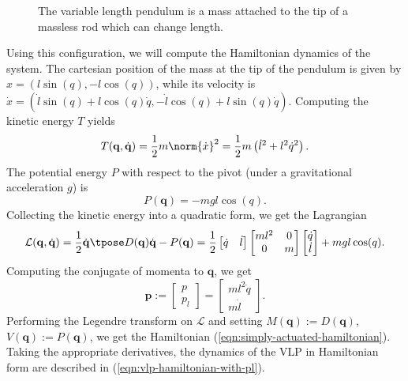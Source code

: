 \begin{figure}
   \centering
   
   \caption{The variable length pendulum is a mass attached to the
      tip of a massless rod which can change length.}\label{fig:vlp-model}
\end{figure}

Using this configuration, we will compute the Hamiltonian dynamics of the system.
The cartesian position of the mass at the tip of the pendulum
is given by \(x = (l\sin(q),-l\cos(q))\), while its velocity is
\(\dot{x} = (\dot{l}\sin(q) + l\cos(q)\dot{q}, -\dot{l}\cos(q) + l\sin(q)\dot{q})\).
Computing the kinetic energy \(T\) yields
\[
   T(\mathbf{q},\dot{\mathbf{q}}) = 
   \frac{1}{2}m\norm{\dot{x}}^2 = \frac{1}{2}m\left(\dot{l}^2 + l^2\dot{q}^2\right)
   .
\]
The potential energy \(P\) with respect to the pivot (under a gravitational
acceleration \(g\)) is
\[
   P(\mathbf{q}) = -mgl\cos(q)
   .
\]
Collecting the kinetic energy into a quadratic form, we get the Lagrangian
\[
   \mathcal{L}(\mathbf{q},\dot{\mathbf{q}}) 
   = \frac{1}{2} \dot{\mathbf{q}}\tpose D(\mathbf{q})\dot{\mathbf{q}} - P(\mathbf{q})
   = \frac{1}{2}
   \begin{bmatrix} \dot{q} & \dot{l} \end{bmatrix}
   \begin{bmatrix}
      ml^2 & 0 \\
      0 & m \\
   \end{bmatrix}
   \begin{bmatrix} 
      \dot{q} \\ \dot{l}
   \end{bmatrix}
   + mgl\cos(q)
   .
\]
Computing the conjugate of momenta to \(\mathbf{q}\), we get 
\[
   \mathbf{p} := \begin{bmatrix} p \\ p_l \end{bmatrix} 
   = \begin{bmatrix} ml^2\dot{q} \\ m\dot{l} \end{bmatrix} 
   .
\]
Performing the Legendre transform on \(\mathcal{L}\) and setting
\(M(\mathbf{q}) := D(\mathbf{q})\), \(V(\mathbf{q}) := P(\mathbf{q})\),
we get the Hamiltonian (\ref{eqn:simply-actuated-hamiltonian}).
Taking the appropriate derivatives, the dynamics of the VLP in Hamiltonian form
are described in (\ref{eqn:vlp-hamiltonian-with-pl}). 
